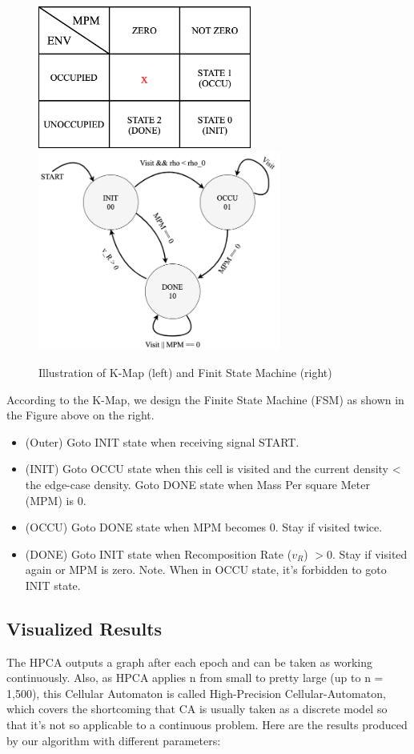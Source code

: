 \documentclass[12pt]{article}
\begin{document}
\begin{figure}[h]
	\small
	\centering
	\includegraphics[width=7cm]{./pictures/K-Map.png}
	\includegraphics[width=8cm]{./pictures/FSM.png}
	\caption{Illustration of K-Map (left) and Finit State Machine (right)}\label{nt}
\end{figure}

According to the K-Map, we design the Finite State Machine (FSM) as shown in the Figure above on the right.
\begin{itemize}
\item (Outer) Goto INIT state when receiving signal START.
\item (INIT) Goto OCCU state when this cell is visited and the current density < the edge-case density. Goto DONE state when Mass Per square Meter (MPM) is 0.
\item (OCCU) Goto DONE state when MPM becomes 0. Stay if visited twice.
\item (DONE) Goto INIT state when Recomposition Rate ($v_{R}$) $>0$. Stay if visited again or MPM is zero.
Note. When in OCCU state, it’s forbidden to goto INIT state.
\end{itemize}
 
\subsection{Visualized Results}
The HPCA outputs a graph after each epoch and can be taken as working continuously. Also, as HPCA applies n from small to pretty large (up to n = 1,500), this Cellular Automaton is called High-Precision Cellular-Automaton, which covers the shortcoming that CA is usually taken as a discrete model so that it’s not so applicable to a continuous problem. Here are the results produced by our algorithm with different parameters:
\end{document}
